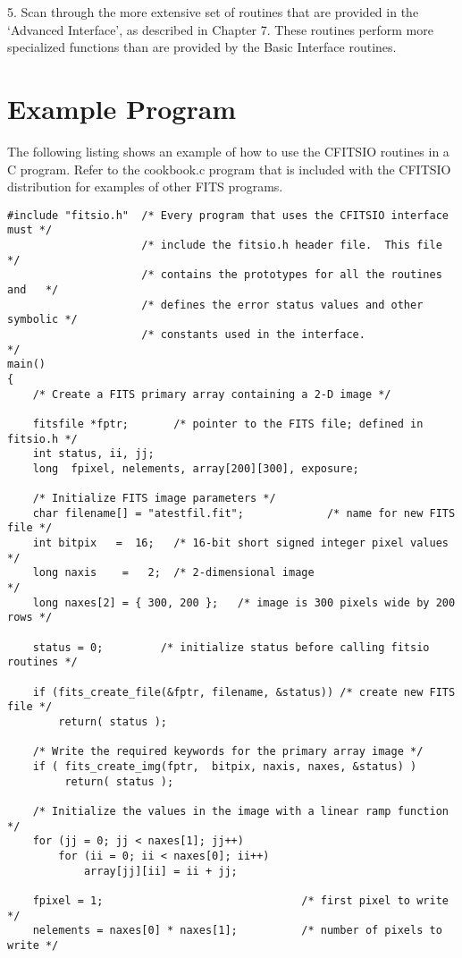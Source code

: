 5.  Scan through the more extensive set of routines that are provided
in the `Advanced Interface', as described in Chapter 7.  These routines
perform more specialized functions than are provided by the Basic
Interface routines.


\section{Example Program}

The following listing shows an example of how to use the CFITSIO
routines in a C program.  Refer to the cookbook.c program that
is included with the CFITSIO distribution for examples of other
FITS programs.


\begin{verbatim}
#include "fitsio.h"  /* Every program that uses the CFITSIO interface must */
                     /* include the fitsio.h header file.  This file       */
                     /* contains the prototypes for all the routines and   */
                     /* defines the error status values and other symbolic */
                     /* constants used in the interface.                   */
main()
{
    /* Create a FITS primary array containing a 2-D image */

    fitsfile *fptr;       /* pointer to the FITS file; defined in fitsio.h */
    int status, ii, jj;
    long  fpixel, nelements, array[200][300], exposure;

    /* Initialize FITS image parameters */
    char filename[] = "atestfil.fit";             /* name for new FITS file */
    int bitpix   =  16;   /* 16-bit short signed integer pixel values       */
    long naxis    =   2;  /* 2-dimensional image                            */
    long naxes[2] = { 300, 200 };   /* image is 300 pixels wide by 200 rows */

    status = 0;         /* initialize status before calling fitsio routines */

    if (fits_create_file(&fptr, filename, &status)) /* create new FITS file */
        return( status );

    /* Write the required keywords for the primary array image */
    if ( fits_create_img(fptr,  bitpix, naxis, naxes, &status) )
         return( status );

    /* Initialize the values in the image with a linear ramp function */
    for (jj = 0; jj < naxes[1]; jj++)
        for (ii = 0; ii < naxes[0]; ii++)
            array[jj][ii] = ii + jj;

    fpixel = 1;                               /* first pixel to write      */
    nelements = naxes[0] * naxes[1];          /* number of pixels to write */


\end{verbatim}
